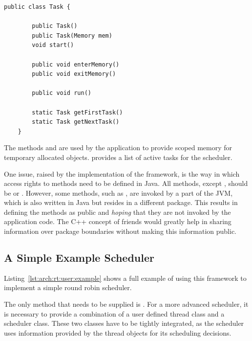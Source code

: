 \begin{lstlisting}[float,caption=A basic schedulable object,
label=lst:arch:rt:user:task, emph={Task, start, enterMemory,
exitMemory,run,getFirstTask,getNextTask}]
    public class Task {

        public Task()
        public Task(Memory mem)
        void start()

        public void enterMemory()
        public void exitMemory()

        public void run()

        static Task getFirstTask()
        static Task getNextTask()
    }
\end{lstlisting}

The methods  and  are used by the
application to provide scoped memory for temporary allocated
objects.  provides a list of active tasks for the
scheduler.

One issue, raised by the implementation of the framework, is the way
in which access rights to methods need to be defined in Java. All
methods, except , should be  or
. However, some methods, such as ,
are invoked by a part of the JVM, which is also written in Java but
resides in a different package. This results in defining the methods
as public and \emph{hoping} that they are not invoked by the
application code. The C++ concept of friends would greatly help in
sharing information over package boundaries without making this
information public.

\subsection{A Simple Example Scheduler}

Listing~\ref{lst:arch:rt:user:example} shows a full example of using
this framework to implement a simple round robin scheduler.

The only method that needs to be supplied is . For
a more advanced scheduler, it is necessary to provide a combination
of a user defined thread class and a scheduler class. These two
classes have to be tightly integrated, as the scheduler uses
information provided by the thread objects for its scheduling
decisions.


